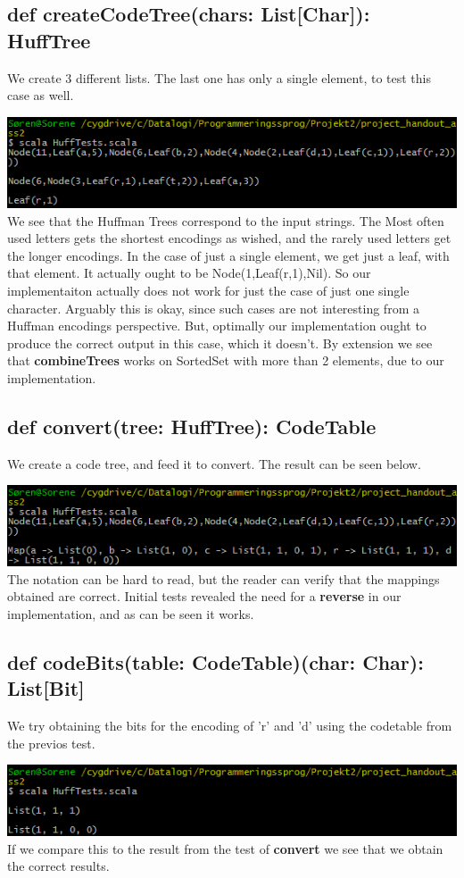 \documentclass{article}
\begin{document}
\subsection{def createCodeTree(chars: List[Char]): HuffTree}
We create 3 different lists. The last one has only a single element, to test this case as well. 

\includegraphics{test5.png}
We see that the Huffman Trees correspond to the input strings. The Most often used letters gets the shortest encodings as wished, and the rarely used letters get the longer encodings. In the case of just a single element, we get just a leaf, with that element. It actually ought to be Node(1,Leaf(r,1),Nil).
So our implementaiton actually does not work for just the case of just one single character. Arguably this is okay, since such cases are not interesting from a Huffman encodings perspective. But, optimally our implementation ought to produce the correct output in this case, which it doesn't. By extension we see that \textbf{combineTrees} works on SortedSet with more than 2 elements, due to our implementation. 

\subsection{def convert(tree: HuffTree): CodeTable}
We create a code tree, and feed it to convert. The result can be seen below.

\includegraphics{test6.png}
The notation can be hard to read, but the reader can verify that the mappings obtained are correct. Initial tests revealed the need for a \textbf{reverse} in our implementation, and as can be seen it works. 


\subsection{def codeBits(table: CodeTable)(char: Char): List[Bit]}
We try obtaining the bits for the encoding of 'r' and 'd' using the codetable from the previos test.

\includegraphics{test7.png}
If we compare this to the result from the test of \textbf{convert} we see that we obtain the correct results. 
\end{document}
